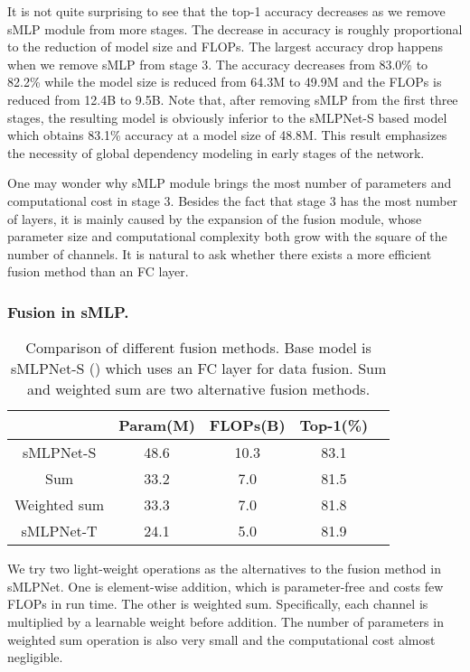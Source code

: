\documentclass[letterpaper]{article} \usepackage{aaai22}  \usepackage{times}  \usepackage{helvet}  \usepackage{courier}  \usepackage[hyphens]{url}  \usepackage{graphicx} \usepackage{color}
\begin{document}
It is not quite surprising to see that the top-1 accuracy decreases as we remove sMLP module from more stages. The decrease in accuracy is roughly proportional to the reduction of model size and FLOPs. The largest accuracy drop happens when we remove sMLP from stage 3. The accuracy decreases from 83.0\% to 82.2\% while the model size is reduced from 64.3M to 49.9M and the FLOPs is reduced from 12.4B to 9.5B. Note that, after removing sMLP from the first three stages, the resulting model is obviously inferior to the sMLPNet-S based model which obtains 83.1\% accuracy at a model size of 48.8M. This result emphasizes the necessity of global dependency modeling in early stages of the network. 

One may wonder why sMLP module brings the most number of parameters and computational cost in stage 3. Besides the fact that stage 3 has the most number of layers, it is mainly caused by the expansion of the fusion module, whose parameter size and computational complexity both grow with the square of the number of channels. It is natural to ask whether there exists a more efficient fusion method than an FC layer. 



\subsubsection{Fusion in sMLP.}
\begin{table}[t]
\centering
\begin{tabular}{c|c c c c}
    \hline
    & Param(M) & FLOPs(B) & Top-1(\%) \\
    \hline
sMLPNet-S     &48.6 &10.3 &83.1  \\
    \hline
    Sum    &33.2 &7.0 & 81.5  \\
    Weighted sum    &33.3 &7.0 &81.8  \\
    \hline
    sMLPNet-T & 24.1 & 5.0 & 81.9 \\
    \hline
\end{tabular}
\caption{Comparison of different fusion methods. Base model is sMLPNet-S () which uses an FC layer for data fusion. Sum and weighted sum are two alternative fusion methods.}
\label{tab:Fusion method}
\end{table}
We try two light-weight operations as the alternatives to the fusion method in sMLPNet. One is element-wise addition, which is parameter-free and costs few FLOPs in run time. The other is weighted sum. Specifically, each channel is multiplied by a learnable weight before addition. The number of parameters in weighted sum operation is also very small and the computational cost almost negligible. 
\end{document}
